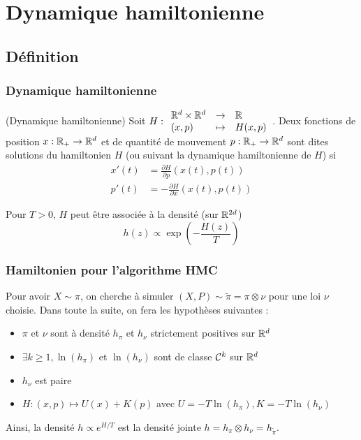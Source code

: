 \documentclass[10pt]{beamer}
\begin{document}
\section{Dynamique hamiltonienne}

\subsection{Définition}

\begin{frame}
	\frametitle{Dynamique hamiltonienne}
	\begin{Def}(Dynamique hamiltonienne)
		Soit $H : { \begin{array}{lcl} \mathbb{R}^d \times \mathbb{R}^d & \to & \mathbb{R} \\ (x,p) & \mapsto & H(x,p) \end{array} }$. Deux fonctions de position $x : \mathbb{R}_+ \to \mathbb{R}^d$ et de quantité de mouvement $p : \mathbb{R}_+ \to \mathbb{R}^d$ sont dites solutions du hamiltonien $H$ (ou suivant la dynamique hamiltonienne de $H$) si
		\begin{equation*}\label{eq:hamiltonian-dyn}
			\begin{aligned}
				x'(t) &= \frac{\partial H}{\partial p} (x(t), p(t)) \\
				p' (t) &= -\frac{\partial H}{\partial x} (x(t), p(t))
			\end{aligned}
		\end{equation*}
	\end{Def}
	Pour $T>0$, $H$ peut être associée à la densité (sur $\mathbb{R}^{2d}$)
	$$
	h(z) \propto \exp \left( -\frac{H(z)}{T} \right)
	$$
\end{frame}
 
\begin{frame}
	\frametitle{Hamiltonien pour l'algorithme HMC}
	Pour avoir $X \sim \pi$, on cherche à simuler $(X,P) \sim \widetilde \pi = \pi \otimes \nu$ pour une loi $\nu$ choisie. Dans toute la suite, on fera les hypothèses suivantes :
	\begin{Hyp}[H]\label{hyp:hyp}
		\begin{itemize}
			\item $\pi$ et $\nu$ sont à densité $h_\pi$ et $h_\nu$ strictement positives sur $\mathbb{R}^d$
			\item $\exists k \geq 1, \ln(h_\pi)$ et $\ln(h_\nu)$ sont de classe $\mathcal{C}^k$ sur $\mathbb{R}^d$
			\item $h_\nu$ est paire
			\item $H : (x,p) \mapsto U(x) + K(p)$ avec $U = - T \ln(h_\pi), K = -T \ln(h_\nu)$
		\end{itemize}
	\end{Hyp}
	Ainsi, la densité $h \propto e^{H/T}$ est la densité jointe $h = h_\pi \otimes h_\nu = h_{\widetilde \pi}$.
\end{frame}
 
\end{document}
